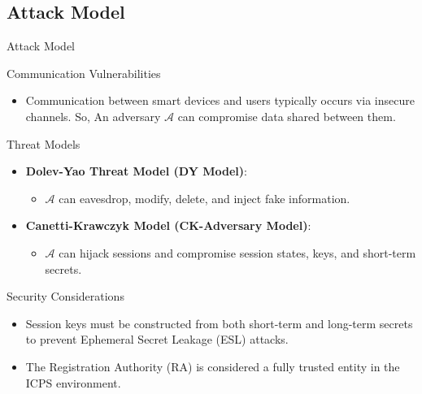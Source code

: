 \documentclass[9pt,handout]{beamer}
\begin{document}
\subsection{Attack Model}

\begin{frame}{Attack Model}

\begin{block}{Communication Vulnerabilities}
    \begin{itemize}
        \item Communication between smart devices and users typically occurs via insecure channels. So, An adversary $\mathcal{A}$ can compromise data shared between them.
    \end{itemize}
\end{block}

\begin{block}{Threat Models}
    \begin{itemize}
        \item \textbf{Dolev-Yao Threat Model (DY Model)}:
        \begin{itemize}
            \item $\mathcal{A}$ can eavesdrop, modify, delete, and inject fake information.
        \end{itemize}

        \item \textbf{Canetti-Krawczyk Model (CK-Adversary Model)}:
        \begin{itemize}
            \item $\mathcal{A}$ can hijack sessions and compromise session states, keys, and short-term secrets.
        \end{itemize}
    \end{itemize}
\end{block}

\begin{block}{Security Considerations}
    \begin{itemize}
        \item Session keys must be constructed from both short-term and long-term secrets to prevent Ephemeral Secret Leakage (ESL) attacks.
        \item The Registration Authority (RA) is considered a fully trusted entity in the ICPS environment.
    \end{itemize}
\end{block}

\end{frame}
\end{document}
